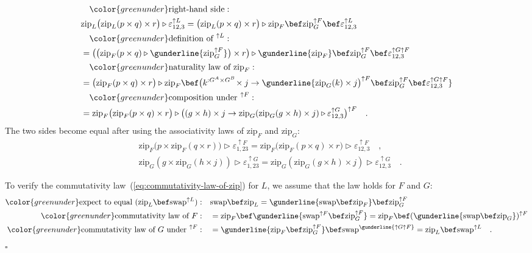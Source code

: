 \begin{align*}
 & \quad{\color{greenunder}\text{right-hand side}:}\quad\\
 & \text{zip}_{L}\big(\text{zip}_{L}(p\times q)\times r\big)\triangleright\varepsilon_{12,3}^{\uparrow L}=\big(\text{zip}_{L}(p\times q)\times r\big)\triangleright\text{zip}_{F}\bef\text{zip}_{G}^{\uparrow F}\bef\varepsilon_{12,3}^{\uparrow L}\\
 & \quad{\color{greenunder}\text{definition of }^{\uparrow L}:}\quad\\
 & =\big(\big(\text{zip}_{F}(p\times q)\triangleright\gunderline{\text{zip}_{G}^{\uparrow F}}\big)\times r\big)\triangleright\gunderline{\text{zip}_{F}}\bef\text{zip}_{G}^{\uparrow F}\bef\varepsilon_{12,3}^{\uparrow G\uparrow F}\\
 & \quad{\color{greenunder}\text{naturality law of }\text{zip}_{F}:}\quad\\
 & =\big(\text{zip}_{F}(p\times q)\times r\big)\triangleright\text{zip}_{F}\bef\big(k^{:G^{A}\times G^{B}}\!\times j\rightarrow\gunderline{\text{zip}_{G}(k)\times j\big)^{\uparrow F}\bef\text{zip}_{G}^{\uparrow F}\bef\varepsilon_{12,3}^{\uparrow G\uparrow F}}\\
 & \quad{\color{greenunder}\text{composition under }^{\uparrow F}:}\quad\\
 & =\text{zip}_{F}\big(\text{zip}_{F}(p\times q)\times r\big)\triangleright\big((g\times h)\times j\rightarrow\text{zip}_{G}(\text{zip}_{G}(g\times h)\times j)\triangleright\varepsilon_{12,3}^{\uparrow G}\big)^{\uparrow F}\quad.
\end{align*}
The two sides become equal after using the associativity laws of $\text{zip}_{F}$
and $\text{zip}_{G}$:
\begin{align*}
 & \text{zip}_{F}\big(p\times\text{zip}_{F}(q\times r)\big)\triangleright\varepsilon_{1,23}^{\uparrow F}=\text{zip}_{F}\big(\text{zip}_{F}(p\times q)\times r\big)\triangleright\varepsilon_{12,3}^{\uparrow F}\quad,\\
 & \text{zip}_{G}(g\times\text{zip}_{G}(h\times j))\triangleright\varepsilon_{1,23}^{\uparrow G}=\text{zip}_{G}(\text{zip}_{G}(g\times h)\times j)\triangleright\varepsilon_{12,3}^{\uparrow G}\quad.
\end{align*}

To verify the commutativity law~(\ref{eq:commutativity-law-of-zip})
for $L$, we assume that the law holds for $F$ and $G$:
\begin{align*}
{\color{greenunder}\text{expect to equal }(\text{zip}_{L}\bef\text{swap}^{\uparrow L}):}\quad & \text{swap}\bef\text{zip}_{L}=\gunderline{\text{swap}\bef\text{zip}_{F}}\bef\text{zip}_{G}^{\uparrow F}\\
{\color{greenunder}\text{commutativity law of }F:}\quad & =\text{zip}_{F}\bef\gunderline{\text{swap}^{\uparrow F}\bef\text{zip}_{G}^{\uparrow F}}=\text{zip}_{F}\bef(\gunderline{\text{swap}\bef\text{zip}_{G}})^{\uparrow F}\\
{\color{greenunder}\text{commutativity law of }G\text{ under }^{\uparrow F}:}\quad & =\gunderline{\text{zip}_{F}\bef\text{zip}_{G}^{\uparrow F}}\bef\text{swap}^{\gunderline{\uparrow G\uparrow F}}=\text{zip}_{L}\bef\text{swap}^{\uparrow L}\quad.
\end{align*}
$\square$

